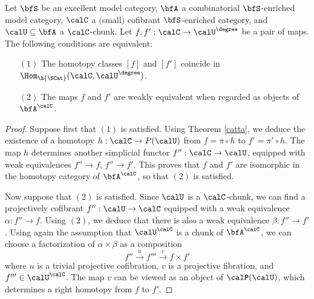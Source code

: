 \begin{Simplicial Categories}
\begin{lemma}\label{tuff}
Let $\bfS$ be an excellent model category, $\bfA$ a combinatorial $\bfS$-enriched model category,
$\calC$ a $($small$)$ cofibrant $\bfS$-enriched category, and $\calU \subseteq \bfA$ a $\calC$-chunk.
Let $f,f': \calC \rightarrow \calU^{\degree}$ be a pair of maps. The following conditions are equivalent:
\begin{itemize}
\item[$(1)$] The homotopy classes $[f]$ and $[f']$ coincide in 
$\Hom_{ \h{\SCat}}( \calC, \calU^{\degree})$.
\item[$(2)$] The maps $f$ and $f'$ are weakly equivalent when regarded as objects
of $\bfA^{\calC}$.
\end{itemize}
\end{lemma}

\begin{proof}

Suppose first that $(1)$ is satisfied. Using Theorem \ref{catta}, we deduce
the existence of a homotopy $h: \calC \rightarrow P(\calU)$ from
$f = \pi \circ h$ to $f' = \pi' \circ h$. The map $h$
determines another simplicial functor $f'': \calC \rightarrow
\calU$, equipped with weak equivalences $f'' \rightarrow f$, $f''
\rightarrow f'$. This proves that $f$ and $f'$ are isomorphic in the homotopy category
of $\bfA^{\calC}$, so that $(2)$ is satisfied.

Now suppose that $(2)$ is satisfied. Since $\calU$ is a $\calC$-chunk, we can find
a projectively cofibrant $f'': \calU \rightarrow \calC$ equipped with a weak equivalence
$\alpha: f'' \rightarrow f$. Using $(2)$, we deduce that there is also a weak equivalence
$\beta: f'' \rightarrow f'$. Using again the assumption that $\calU^{\calC}$ is a chunk of
$\bfA^{\calC}$, we can choose a factorization of $\alpha \times \beta$ as a composition
$$ f'' \stackrel{u}{\rightarrow} f''' \stackrel{v}{\rightarrow} f \times f'$$ 
where $u$ is a trivial projective cofibration, $v$ is a projective fibration, and
$f''' \in \calU^{\calC}$. The map $v$ can be viewed as an object of $\calP(\calU)$, which
determines a right homotopy from $f$ to $f'$. 
\end{proof}


\end{Simplicial Categories}
